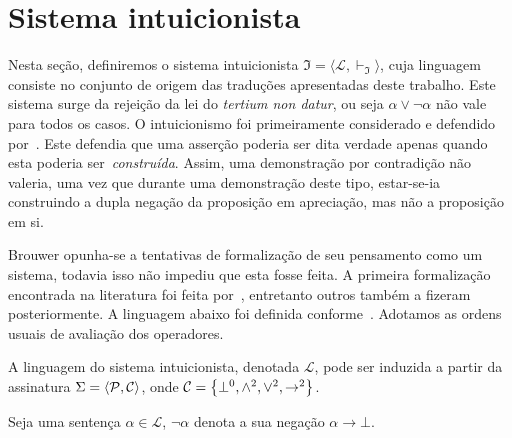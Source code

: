 \section{Sistema intuicionista}

Nesta seção, definiremos o sistema intuicionista $\mathfrak{I}=\langle\mathcal{L},\vdash_\mathfrak{I}\rangle$, cuja linguagem consiste no conjunto de origem das traduções apresentadas deste trabalho.
Este sistema surge da rejeição da lei do \textit{tertium non datur}, ou seja $\alpha\mathrel{\vee}\neg\alpha$ não vale para todos os casos.
O intuicionismo foi primeiramente considerado e defendido por~\cite{Brouwer.1908}.
Este defendia que uma asserção poderia ser dita verdade apenas quando esta poderia ser~\emph{construída}.
Assim, uma demonstração por contradição não valeria, uma vez que durante uma demonstração deste tipo, estar-se-ia construindo a dupla negação da proposição em apreciação, mas não a proposição em si.

\vspace{0.5\baselineskip}
Brouwer opunha-se a tentativas de formalização de seu pensamento como um sistema, todavia isso não impediu que esta fosse feita.
A primeira formalização encontrada na literatura foi feita por~\cite{Kolmogorov.1967}, entretanto outros também a fizeram posteriormente.
A linguagem abaixo foi definida conforme~\cite{Troelstra+Schwichtenberg.2000}. Adotamos as ordens usuais de avaliação dos operadores.

\vspace{0.5\baselineskip}
\begin{tcolorbox}[enhanced jigsaw, breakable, sharp corners, colframe=black, colback=white, boxrule=0.5pt, left=1.5mm, right=1.5mm, top=1.5mm, bottom=1.5mm]
    \begin{definition}[$\mathcal{L}$]\label{intuitionistic.language}
        A linguagem do sistema intuicionista, denotada $\mathcal{L}$, pode ser induzida a partir da assinatura $\Sigma=\langle\mathcal{P},\mathcal{C}\rangle$, onde $\mathcal{C}=\left\{\bot^0,\wedge^2,\vee^2,\to^2\right\}$.
    \end{definition}
\end{tcolorbox}

\begin{tcolorbox}[enhanced jigsaw, breakable, sharp corners, colframe=black, colback=white, boxrule=0.5pt, left=1.5mm, right=1.5mm, top=1.5mm, bottom=1.5mm]
    \begin{notation}
        Seja uma sentença $\alpha\in\mathcal{L}$, $\neg\alpha$ denota a sua negação $\alpha\to\bot$.
    \end{notation}
\end{tcolorbox}

